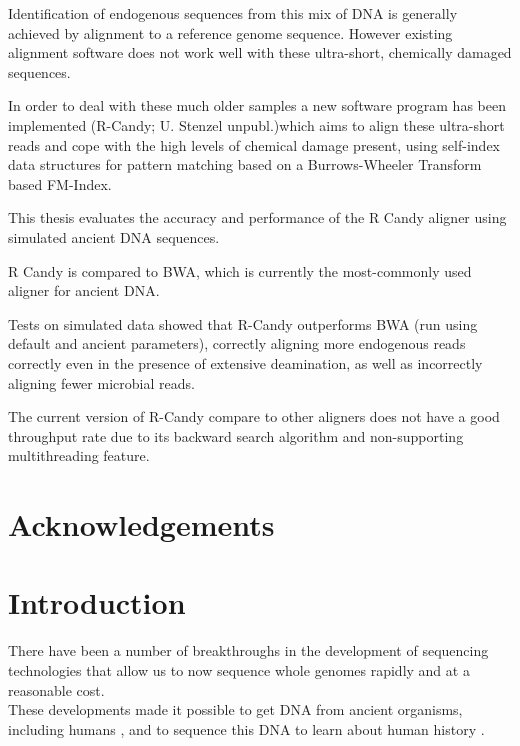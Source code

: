\documentclass[11pt,a4paper]{report}
\begin{document}
Identification of endogenous sequences from this mix of DNA is generally achieved by
alignment to a reference genome sequence. 
However existing alignment software does not work well with these ultra-short, 
chemically damaged sequences.

In order to deal with these much older samples a new software program has been implemented
(R-Candy; U. Stenzel unpubl.)which aims to align these ultra-short reads and cope with the high 
levels of chemical damage present, using self-index data structures for pattern matching
based on a Burrows-Wheeler Transform based FM-Index.


This thesis evaluates the accuracy and performance of the R Candy aligner using 
simulated ancient DNA sequences. 

R Candy is compared to BWA, which is currently the most-commonly used aligner for ancient DNA.

Tests on simulated data showed that R-Candy outperforms BWA (run using default 
and ancient parameters), correctly aligning more endogenous reads correctly even
in the presence of extensive deamination, as well as incorrectly aligning fewer
microbial reads.

The current version of R-Candy compare to other aligners does not have a good 
throughput rate due to its backward search algorithm and non-supporting multithreading feature. 

\newpage\null\thispagestyle{empty}\newpage
\section*{Acknowledgements}
\newpage\null\thispagestyle{empty}\newpage

\tableofcontents
\newpage
\listoftables
\newpage
\listoffigures
\newpage




\section{Introduction} \label{Introduction}


There have been a number of breakthroughs in the development of sequencing 
technologies that allow us to now sequence whole genomes rapidly and at a 
reasonable cost\cite{NGS}\cite{454}\cite{NGS2}.
\\
These developments made it possible to get DNA from ancient organisms, 
including humans \cite{AncientDNA}\cite{fish2human}, and to sequence 
this DNA to learn about human history\cite{impactOFhg}\cite{ourGenome}
\cite{SNP}.
\end{document}
